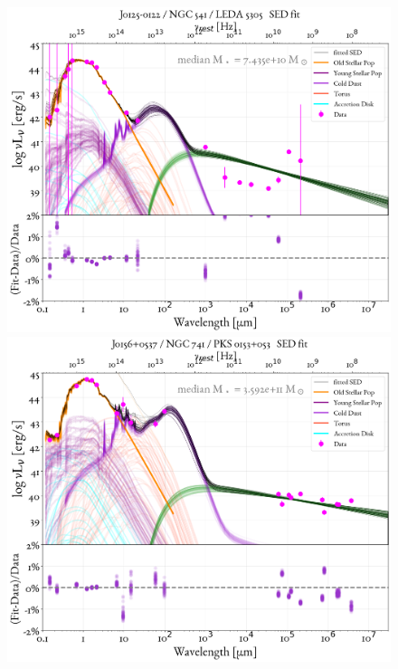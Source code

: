 \begin{figure}
    \centering
    \includegraphics[width=0.85\linewidth]{figures/ResultFits/93_SEDfit_5260.png}\\
    \includegraphics[width=0.85\linewidth]{figures/ResultFits/94_SEDfit_5261.png}   
\end{figure}
